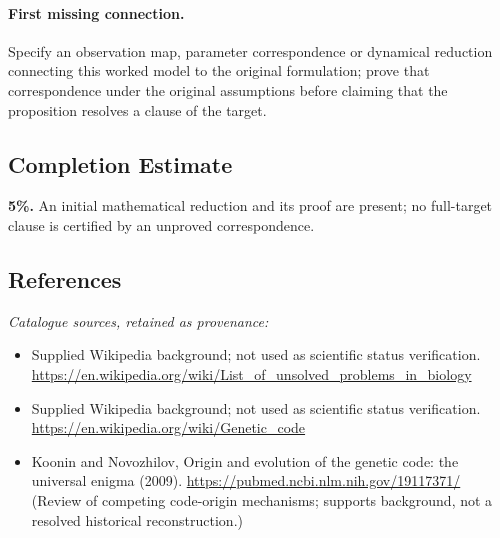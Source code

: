 \documentclass[11pt]{article}
\begin{document}
\paragraph{First missing connection.} Specify an observation map, parameter correspondence or dynamical reduction connecting this worked model to the original formulation; prove that correspondence under the original assumptions before claiming that the proposition resolves a clause of the target.
\subsection{Completion Estimate}
\textbf{5\%.} An initial mathematical reduction and its proof are present; no full-target clause is certified by an unproved correspondence.
\subsection{References}
\noindent\emph{Catalogue sources, retained as provenance:}
\begin{itemize}
\item Supplied Wikipedia background; not used as scientific status verification. \url{https://en.wikipedia.org/wiki/List_of_unsolved_problems_in_biology}
\item Supplied Wikipedia background; not used as scientific status verification. \url{https://en.wikipedia.org/wiki/Genetic_code}
\item Koonin and Novozhilov, Origin and evolution of the genetic code: the universal enigma (2009). \url{https://pubmed.ncbi.nlm.nih.gov/19117371/} (Review of competing code-origin mechanisms; supports background, not a resolved historical reconstruction.)
\end{itemize}
\clearpage


\appendix
\end{document}
